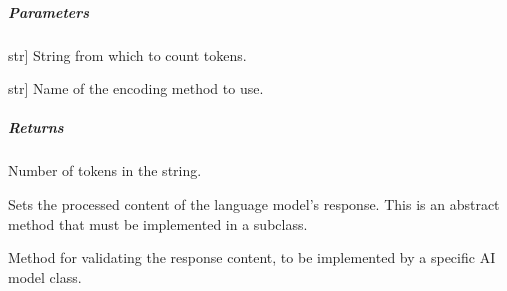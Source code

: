 \documentclass[letterpaper,10pt,english]{sphinxmanual}
\begin{document}
\begin{fulllineitems}
\begin{fulllineitems}
\subparagraph{Parameters}
\label{\detokenize{main.ai_language_model:parameters}}\begin{description}
\sphinxlineitem{string}{[}str{]}
\sphinxAtStartPar
String from which to count tokens.

\sphinxlineitem{encoding\_name}{[}str{]}
\sphinxAtStartPar
Name of the encoding method to use.

\end{description}


\subparagraph{Returns}
\label{\detokenize{main.ai_language_model:returns}}\begin{description}
\sphinxAtStartPar
Number of tokens in the string.

\end{description}

\end{fulllineitems}


\begin{fulllineitems}
\label{\detokenize{main.ai_language_model:main.ai_language_model.ai_language_model.AILanguageModel.set_response_content}}
\pysigstartsignatures
{}
\pysigstopsignatures
\sphinxAtStartPar
Sets the processed content of the language model’s response. This is an abstract method that must be
implemented in a subclass.

\end{fulllineitems}


\begin{fulllineitems}
\label{\detokenize{main.ai_language_model:main.ai_language_model.ai_language_model.AILanguageModel.validate_response_content}}
\pysigstartsignatures
{}
\pysigstopsignatures
\sphinxAtStartPar
Method for validating the response content, to be implemented by a specific AI model class.

\end{fulllineitems}


\end{fulllineitems}
\end{document}
